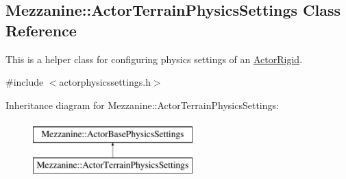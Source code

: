 \hypertarget{classMezzanine_1_1ActorTerrainPhysicsSettings}{
\subsection{Mezzanine::ActorTerrainPhysicsSettings Class Reference}
\label{classMezzanine_1_1ActorTerrainPhysicsSettings}
}


This is a helper class for configuring physics settings of an \hyperlink{classMezzanine_1_1ActorRigid}{ActorRigid}.  




{\ttfamily \#include $<$actorphysicssettings.h$>$}

Inheritance diagram for Mezzanine::ActorTerrainPhysicsSettings:\begin{figure}[H]
\begin{center}
\leavevmode
\includegraphics[height=2.000000cm]{classMezzanine_1_1ActorTerrainPhysicsSettings}
\end{center}
\end{figure}
